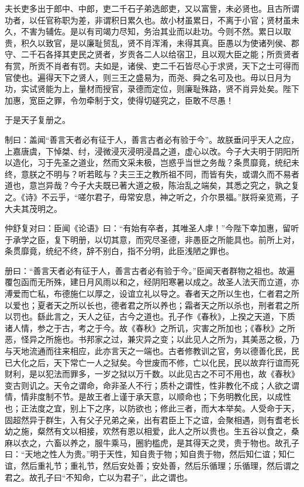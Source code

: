 \documentclass[12pt,UTF8]{ctexbook}
\begin{document}
夫长吏多出于郎中、中郎，吏二千石子弟选郎吏，又以富訾，未必贤也。且古所谓功者，以任官称职为差，非谓积日累久也。故小材虽累日，不离于小官；贤材虽未久，不害为辅佐。是以有司竭力尽知，务治其业而以赴功。今则不然。累日以取贵，积久以致官，是以廉耻贸乱，贤不肖浑淆，未得其真。臣愚以为使诸列侯、郡守、二千石各择其吏民之贤者，岁贡各二人以给宿卫，且以观大臣之能；所贡贤者有赏，所贡不肖者有罚。夫如是，诸侯、吏二千石皆尽心于求贤，天下之士可得而官使也。遍得天下之贤人，则三王之盛易为，而尧、舜之名可及也。毋以日月为功，实试贤能为上，量材而授官，录德而定位，则廉耻殊路，贤不肖异处矣。陛下加惠，宽臣之罪，令勿牵制于文，使得切磋究之，臣敢不尽愚！



于是天子复册之。



制曰：盖闻“善言天者必有征于人，善言古者必有验于今”。故朕垂问乎天人之应，上嘉唐虞，下悼桀、纣，浸微浸灭浸明浸昌之道，虚心以改。今子大夫明于阴阳所以造化，习于先圣之道业，然而文采未极，岂惑乎当世之务哉？条贯靡竟，统纪未终，意朕之不明与？听若眩与？夫三王之教所祖不同，而皆有失，或谓久而不易者道也，意岂异哉？今子大夫既已著大道之极，陈治乱之端矣，其悉之究之，孰之复之。《诗》不云乎，“嗟尔君子，毋常安息，神之听之，介尔景福。”朕将亲览焉，子大夫其茂明之。



仲舒复对曰：臣闻《论语》曰：“有始有卒者，其唯圣人虖！”今陛下幸加惠，留听于承学之臣，复下明册，以切其意，而究尽圣德，非愚臣之所能具也。前所上对，条贯靡竟，统纪不终，辞不别白，指不分明，此臣浅陋之罪也。



册曰：“善言天者必有征于人，善言古者必有验于今。”臣闻天者群物之祖也。故遍覆包函而无所殊，建日月风雨以和之，经阴阳寒暑以成之。故圣人法天而立道，亦溥爱而亡私，布德施仁以厚之，设谊立礼以导之。春者天之所以生也，仁者君之所以爱也；夏者天之所以长也，德者君之所以养也；霜者天之所以杀也，刑者君之所以罚也。繇此言之，天人之征，古今之道也。孔子作《春秋》，上揆之天道，下质诸人情，参之于古，考之于今。故《春秋》之所讥，灾害之所加也；《春秋》之所恶，怪异之所施也。书邦家之过，兼灾异之变；以此见人之所为，其美恶之极，乃与天地流通而往来相应，此亦言天之一端也。古者修教训之官，务以德善化民，民已大化之后，天下常亡一人之狱矣。今世废而不修，亡以化民，民以故弃行谊而死财利，是以犯法而罪多，一岁之狱以万千数。以此见古之不可不用也，故《春秋》变古则讥之。天令之谓命，命非圣人不行；质朴之谓性，性非教化不成；人欲之谓情，情非度制不节。是故王者上谨于承天意，以顺命也；下务明教化民，以成性也；正法度之宜，别上下之序，以防欲也；修此三者，而大本举矣。人受命于天，固超然异于群生，入有父子兄弟之亲，出有君臣上下之谊，会聚相遇，则有耆老长幼之施，粲然有文以相接，欢然有恩以相爱，此人之所以贵也。生五谷以食之，桑麻以衣之，六畜以养之，服牛乘马，圈豹槛虎，是其得天之灵，贵于物也。故孔子曰：“天地之性人为贵。”明于天性，知自贵于物；知自贵于物，然后知仁谊；知仁谊，然后重礼节；重礼节，然后安处善；安处善，然后乐循理；乐循理，然后谓之君之。故孔子曰“不知命，亡以为君子”，此之谓也。
\end{document}
